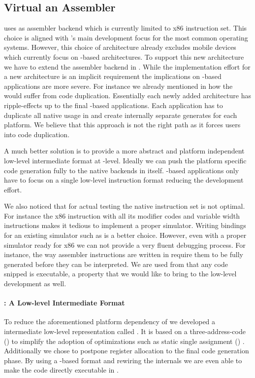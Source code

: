 \subsection{Virtual \CPU an Assembler \DSL}
\B uses \AsmJIT as assembler backend which is currently limited to x86 instruction set.
This choice is aligned with \PH's main development focus for the most common operating systems.
However, this choice of architecture already excludes mobile devices which currently focus on \ARM-based architectures.
To support this new architecture we have to extend the assembler backend in \AsmJIT.
While the implementation effort for a new \AsmJIT architecture is an implicit requirement the implications on \B-based applications are more severe.
For instance we already mentioned in  how the \NB \FFI would suffer from code duplication.
Essentially each newly added \CPU architecture has ripple-effects up to the final \B-based applications.
Each \B application has to duplicate all native usage in and create internally separate generates for each platform.
We believe that this approach is not the right path as it forces \B users into code duplication.

A much better solution is to provide a more abstract and platform independent low-level intermediate format at \B-level.
Ideally we can push the platform specific code generation fully to the native backends in \B itself.
\B-based applications only have to focus on a single low-level instruction format reducing the development effort.

We also noticed that for actual testing the native instruction set is not optimal.
For instance the x86 instruction with all its modifier codes and variable width instructions makes it tedious to implement a proper simulator.
Writing bindings for an existing simulator such as  is a better choice.
However, even with a proper simulator ready for x86 we can not provide a very fluent debugging process.
For instance, the way assembler instructions are written in \B require them to be fully generated before they can be interpreted.
We are used from \PH that any code snipped is executable, a property that we would like to bring to the low-level development as well.

\paragraph{\VCPU: A Low-level Intermediate Format}
To reduce the aforementioned platform dependency of \B we developed a intermediate low-level representation called \VCPU.
It is based on a three-address-code (\TAC) to simplify the adoption of optimizations such as static single assignment (\SSA) \cite{Cytr91a}.
Additionally we chose to postpone register allocation to the final code generation phase.
By using a \TAC-based format and rewiring the internals we are even able to make the \VCPU code directly executable in \PH.

